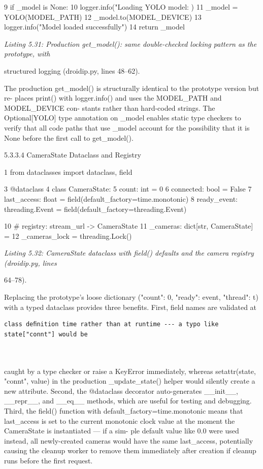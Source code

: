 9 if \_model is None:
10 logger.info("Loading YOLO model: %
)
11 \_model = YOLO(MODEL\_PATH)
12 \_model.to(MODEL\_DEVICE)
13 logger.info("Model loaded successfully")
14 return \_model


\textit{Listing 5.31: Production get\_model(): same double-checked locking pattern as the prototype, with}

structured logging (droidip.py, lines 48--62).


The production get\_model() is structurally identical to the prototype version but re-
places print() with logger.info() and uses the MODEL\_PATH and MODEL\_DEVICE con-
stants rather than hard-coded strings. The Optional[YOLO] type annotation on \_model
enables static type checkers to verify that all code paths that use \_model account for the
possibility that it is None before the ﬁrst call to get\_model().


5.3.3.4 CameraState Dataclass and Registry

1 from dataclasses import dataclass, field

3 @dataclass
4 class CameraState:
5 count: int = 0
6 connected: bool = False
7 last\_access: float = field(default\_factory=time.monotonic)
8 ready\_event: threading.Event = field(default\_factory=threading.Event)


10 \# registry: stream\_url -> CameraState
11 \_cameras: dict[str, CameraState] = {}
12 \_cameras\_lock = threading.Lock()


\textit{Listing 5.32: CameraState dataclass with ﬁeld() defaults and the camera registry (droidip.py, lines}

64--78).


Replacing the prototype's loose dictionary ({"count": 0, "ready": event, "thread":
t}) with a typed dataclass provides three beneﬁts. First, ﬁeld names are validated at
\begin{lstlisting}
class deﬁnition time rather than at runtime --- a typo like state["connt"] would be



\end{lstlisting}

caught by a type checker or raise a KeyError immediately, whereas setattr(state,
"connt", value) in the production \_update\_state() helper would silently create a
new attribute. Second, the @dataclass decorator auto-generates \_\_init\_\_, \_\_repr\_\_,
and \_\_eq\_\_ methods, which are useful for testing and debugging. Third, the field()
function with default\_factory=time.monotonic means that last\_access is set to the
current monotonic clock value at the moment the CameraState is instantiated --- if a sim-
ple default value like 0.0 were used instead, all newly-created cameras would have the
same last\_access, potentially causing the cleanup worker to remove them immediately
after creation if cleanup runs before the ﬁrst request.

